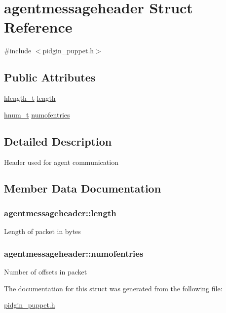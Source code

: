 \hypertarget{structagentmessageheader}{}\section{agentmessageheader Struct Reference}
\label{structagentmessageheader}


{\ttfamily \#include $<$pidgin\+\_\+puppet.\+h$>$}

\subsection*{Public Attributes}
\begin{DoxyCompactItemize}
\item 
\hyperlink{pidgin__puppet_8h_a2eb3b718074d951580394651dec99eae}{hlength\+\_\+t} \hyperlink{structagentmessageheader_af24484d2b5c15ef4de3ae6f71cbba463}{length}
\item 
\hyperlink{pidgin__puppet_8h_ac991ce97ed2ac2d3a08fbef807b117c6}{hnum\+\_\+t} \hyperlink{structagentmessageheader_a7f2f76c9d50c026b0a5e64f78f7e9f17}{numofentries}
\end{DoxyCompactItemize}


\subsection{Detailed Description}
Header used for agent communication 

\subsection{Member Data Documentation}
\subsubsection[{\texorpdfstring{length}{length}}]{ agentmessageheader\+::length}\hypertarget{structagentmessageheader_af24484d2b5c15ef4de3ae6f71cbba463}{}\label{structagentmessageheader_af24484d2b5c15ef4de3ae6f71cbba463}
Length of packet in bytes 
\subsubsection[{\texorpdfstring{numofentries}{numofentries}}]{ agentmessageheader\+::numofentries}\hypertarget{structagentmessageheader_a7f2f76c9d50c026b0a5e64f78f7e9f17}{}\label{structagentmessageheader_a7f2f76c9d50c026b0a5e64f78f7e9f17}
Number of offsets in packet 

The documentation for this struct was generated from the following file\+:\begin{DoxyCompactItemize}
\item 
\hyperlink{pidgin__puppet_8h}{pidgin\+\_\+puppet.\+h}\end{DoxyCompactItemize}
